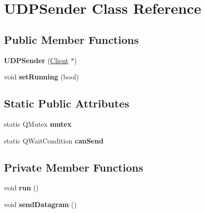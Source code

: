 \hypertarget{classUDPSender}{
\section{UDPSender Class Reference}
\label{classUDPSender}
}
\subsection*{Public Member Functions}
\begin{DoxyCompactItemize}
\item 
\hypertarget{classUDPSender_a6c49b0e6d4373b1b7f1103403f837d22}{
{\bfseries UDPSender} (\hyperlink{classClient}{Client} $\ast$)}
\label{classUDPSender_a6c49b0e6d4373b1b7f1103403f837d22}

\item 
\hypertarget{classUDPSender_a7d3b9cb339e730c0ad576b13fe994b8b}{
void {\bfseries setRunning} (bool)}
\label{classUDPSender_a7d3b9cb339e730c0ad576b13fe994b8b}

\end{DoxyCompactItemize}
\subsection*{Static Public Attributes}
\begin{DoxyCompactItemize}
\item 
\hypertarget{classUDPSender_a1b054a0c92b84a80954d6fd7f96eea70}{
static QMutex {\bfseries mutex}}
\label{classUDPSender_a1b054a0c92b84a80954d6fd7f96eea70}

\item 
\hypertarget{classUDPSender_ada4810e9a607561509ae471d2ba8ac2a}{
static QWaitCondition {\bfseries canSend}}
\label{classUDPSender_ada4810e9a607561509ae471d2ba8ac2a}

\end{DoxyCompactItemize}
\subsection*{Private Member Functions}
\begin{DoxyCompactItemize}
\item 
\hypertarget{classUDPSender_a2507f9459a454129b845f1d7e859fb09}{
void {\bfseries run} ()}
\label{classUDPSender_a2507f9459a454129b845f1d7e859fb09}

\item 
\hypertarget{classUDPSender_aeac20143f1a9c93d535c53cbf720db60}{
void {\bfseries sendDatagram} ()}
\label{classUDPSender_aeac20143f1a9c93d535c53cbf720db60}

\end{DoxyCompactItemize}
